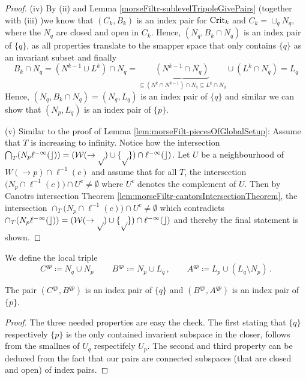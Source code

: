\begin{proof}
	(iv) By (ii) and Lemma \ref{morseFiltr-sublevelTripoleGivePairs} (together with (iii) )we know that $(C_k,B_k)$ is an index pair for $\mathrm{Crit}_k$ and $C_k=\sqcup_q N_q$, where the $N_q$ are closed and open in $C_k$. Hence, $(N_q,B_k\cap N_q)$ is an index pair of $\{q\}$, as all properties translate to the smapper space that only contains $\{q\}$ as an invariant subset and finally 
		\begin{equation*}
			B_k\cap N_q=(N^{k-1}\cup L^k)\cap N_q=\underbrace{(N^{k-1}\cap N_q)}_{\subseteq (N^k\cap N^{k-1})\cap N_q \subseteq L^k \cap N_q}\cup (L^k\cap N_q)=L_q
		\end{equation*}
		Hence, $(N_q,B_k\cap N_q)=(N_q,L_q)$ is an index pair of $\{q\}$ and similar we can show that $(N_p,L_q)$ is an index pair of $\{p\}$.

	(v) Similar to the proof of Lemma \ref{lem:morseFilt-piecesOfGlobalSetup}: Assume that $T$ is increasing to infinity. Notice how the intersection $\bigcap_T (N_p \cal \ell^{-1}(c))=(W(\to p)\cup \{p\})\cap \ell^{-1}(c)$. Let $U$ be a neighbourhood of $W(\to p)\cap \ell^{-1}(c)$ and assume that for all $T$, the intersection $\big(N_p\cap \ell^{-1}(c)\big)\cap U^c\neq \emptyset$ where $U^c$ denotes the complement of $U$. Then by Canotrs intersection Theorem \ref{lem:morseFiltr-cantorsIntersectionTheorem}, the intersection $\cap_T \big(N_p\cap \ell^{-1}(c)\big)\cap U^c \neq \emptyset$ which contradicts $\cap_T (N_p \cal \ell^{-1}(c))=(W(\to p)\cup \{p\})\cap \ell^{-1}(c)$ and thereby the final statement is shown.
\end{proof}
\begin{definition}\label{def:morseFiltr-localTriplaABC}
	We define the local triple 
	\begin{equation*}
		C^{qp}\coloneq N_q\cup N_p\,\qquad B^{qp}\coloneq N_p\cup L_q\,,\qquad A^{qp}\coloneq L_p \cup (L_q\setminus N_p)\,.
	\end{equation*}
\end{definition}
\begin{corollary}
	The pair $(C^{qp},B^{qp})$ is an index pair of $\{q\}$ and $(B^{qp},A^{qp})$ is an index pair of $\{p\}$. 
\end{corollary}
\begin{proof}
	The three needed properties are easy the check. The first stating that $\{q\}$ respectively $\{p\}$ is the only contained invarient subspace in the closer, follows from the smallnes of $U_q$ respectifely $U_p$. The second and third property can be deduced from the fact that our pairs are connected subspaces (that are closed and open) of index pairs. 
\end{proof}
